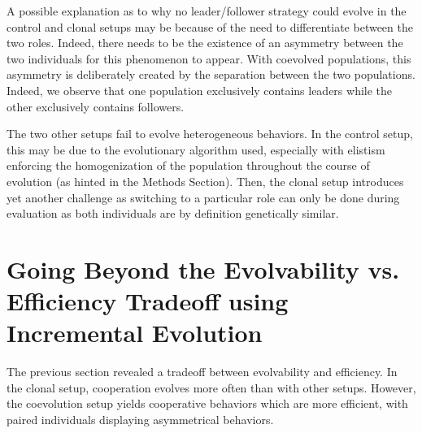     A possible explanation as to why no leader/follower strategy could evolve in the control and clonal setups may be because of the need to differentiate between the two roles. Indeed, there needs to be the existence of an asymmetry between the two individuals for this phenomenon to appear. With coevolved populations, this asymmetry is deliberately created by the separation between the two populations. Indeed, we observe that one population exclusively contains leaders while the other exclusively contains followers. 

    The two other setups fail to evolve heterogeneous behaviors. In the control setup, this may be due to the evolutionary algorithm used, especially with elistism enforcing the homogenization of the population throughout the course of evolution (as hinted in the Methods Section). Then, the clonal setup introduces yet another challenge as switching to a particular role can only be done during evaluation as both individuals are by definition genetically similar.

    \begin{table}[h]
      \caption{\textbf{Evolution of a cooperative strategy.}
      Repartition of the different strategies evolved in each of the runs where cooperation evolved for each setup in the foraging task. We indicate in each cell the number of simulations where a particular strategy evolved.}
      \label{tab:ForagingBehaviors}
    \end{table}

\section{Going Beyond the Evolvability vs. Efficiency Tradeoff using Incremental Evolution}

  The previous section revealed a tradeoff between evolvability and efficiency. In the clonal setup, cooperation evolves more often than with other setups. However, the coevolution setup yields cooperative behaviors which are more efficient, with paired individuals displaying asymmetrical behaviors.

